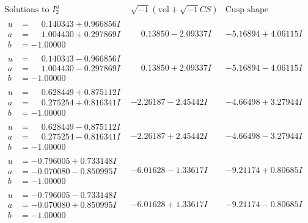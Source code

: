 \documentclass[1p]{elsarticle_modified}
\theoremstyle{definition}
\newcommand{\I}{\sqrt{-1}}
\begin{document}
$$\begin{array}{c|c|c}  
\text{Solutions to }I^u_{2}& \I (\text{vol} + \sqrt{-1}CS) & \text{Cusp shape}\\
 \hline 
\begin{aligned}
u &= \phantom{-}0.140343 + 0.966856 I \\
a &= \phantom{-}1.004430 + 0.297869 I \\
b &= -1.00000\phantom{ +0.000000I}\end{aligned}
 & \phantom{-}0.13850 - 2.09337 I & -5.16894 + 4.06115 I \\ \hline\begin{aligned}
u &= \phantom{-}0.140343 - 0.966856 I \\
a &= \phantom{-}1.004430 - 0.297869 I \\
b &= -1.00000\phantom{ +0.000000I}\end{aligned}
 & \phantom{-}0.13850 + 2.09337 I & -5.16894 - 4.06115 I \\ \hline\begin{aligned}
u &= \phantom{-}0.628449 + 0.875112 I \\
a &= \phantom{-}0.275254 + 0.816341 I \\
b &= -1.00000\phantom{ +0.000000I}\end{aligned}
 & -2.26187 - 2.45442 I & -4.66498 + 3.27944 I \\ \hline\begin{aligned}
u &= \phantom{-}0.628449 - 0.875112 I \\
a &= \phantom{-}0.275254 - 0.816341 I \\
b &= -1.00000\phantom{ +0.000000I}\end{aligned}
 & -2.26187 + 2.45442 I & -4.66498 - 3.27944 I \\ \hline\begin{aligned}
u &= -0.796005 + 0.733148 I \\
a &= -0.070080 - 0.850995 I \\
b &= -1.00000\phantom{ +0.000000I}\end{aligned}
 & -6.01628 - 1.33617 I & -9.21174 + 0.80685 I \\ \hline\begin{aligned}
u &= -0.796005 - 0.733148 I \\
a &= -0.070080 + 0.850995 I \\
b &= -1.00000\phantom{ +0.000000I}\end{aligned}
 & -6.01628 + 1.33617 I & -9.21174 - 0.80685 I \\ \hline\begin{aligned}

\end{aligned}
\end{array}$$
\end{document}
